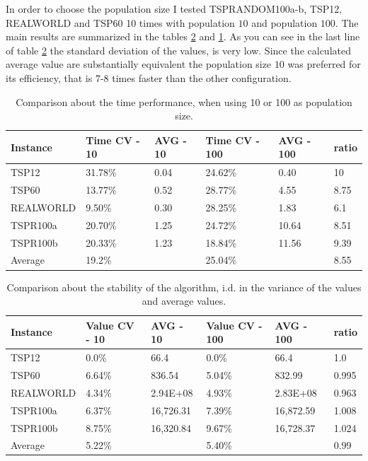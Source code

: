 In order to choose the population size I tested TSPRANDOM100a-b, TSP12, REALWORLD and TSP60 10 times with population $10$ and population $100$.
The main results are summarized in the tables \ref{table:valuestability} and \ref{table:timestability}.
As you can see in the last line of table \ref{table:valuestability} the standard deviation of the values, is very low.
Since the calculated average value are substantially equivalent the population size $10$ was preferred
for its efficiency, that is 7-8 times faster than the other configuration. 
\begin{table}
	\begin{tabular}{| l || l | l || l | l| l | }
		\hline
		Instance 		& Time CV - 10 & AVG - 10  & Time CV - 100 & AVG - 100 & ratio  \\
		\hline
		TSP12    		& 31.78\%           &    0.04     & 24.62\% &  0.40 & 10\\
		TSP60    		& 13.77\%           &  	 0.52	  & 28.77\% &  4.55 & 8.75\\
		REALWORLD		& 9.50\%            &  	 0.30	  & 28.25\% &  1.83 & 6.1\\
		TSPR100a 		& 20.70\%	        	&  	 1.25	  & 24.72\% &  10.64 & 8.51\\
		TSPR100b 		& 20.33\%				&  	 1.23	  & 18.84\% &  11.56 & 9.39\\
		\hline
		Average			&		19.2\%		&			  &	25.04\%	&		 & 8.55\\
		\hline
	\end{tabular}
	\caption{Comparison about the time performance, when using 10 or 100 as population size.}
	\label{table:timestability}
\end{table}

\begin{table}
	\begin{tabular}{| l || l | l || l | l| l |}
		\hline
		Instance 		& Value CV - 10 & AVG - 10  & Value CV - 100 & AVG  - 100 & ratio \\
		\hline
		TSP12    		& 0.0\%             &    66.4     & 0.0\% 	&  66.4 & 1.0 \\
		TSP60    		& 6.64\%            &  	 836.54	  & 5.04\% 	& 832.99 & 0.995\\
		REALWORLD		& 4.34\%            &  2.94E+08	    & 4.93\% &  2.83E+08 & 0.963\\
		TSPR100a 	& 6.37\%	        &  	 16,726.31  & 7.39\% &  16,872.59 & 1.008\\
		TSPR100b 	& 8.75\%			&  	 16,320.84	  & 9.67\% &  16,728.37 & 1.024\\
		\hline
		Average    &    5.22\%          &                   & 5.40\%  &            & 0.99 \\
		\hline 
	\end{tabular}
	\caption{Comparison about the stability of the algorithm, i.d. in the variance of the values and average values.}
	\label{table:valuestability}
\end{table}
 



